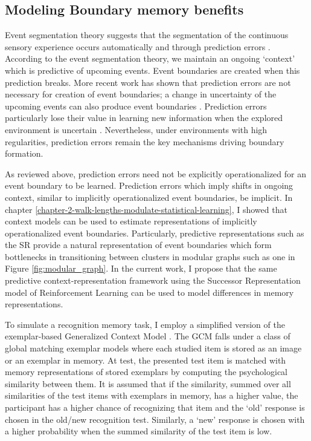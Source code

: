 \subsection*{Modeling Boundary memory benefits}
Event segmentation theory suggests that the segmentation of the continuous sensory experience occurs automatically and through prediction errors \parencite{zacks2007event,zacks2007eventp, swallow2009event}. According to the event segmentation theory, we maintain an ongoing `context' which is predictive of upcoming events. Event boundaries are created when this prediction breaks. More recent work has shown that prediction errors are not necessary for creation of event boundaries; a change in uncertainty of the upcoming events can also produce event boundaries \parencite{shin2021structuring}. Prediction errors particularly lose their value in learning new information when the explored environment is uncertain \parencite{behrens2007learning}. Nevertheless, under environments with high regularities, prediction errors remain the key mechanisms driving boundary formation. 

As reviewed above, prediction errors need not be explicitly operationalized for an event boundary to be learned. Prediction errors which imply shifts in ongoing context, similar to implicitly operationalized event boundaries,  be implicit. In chapter \ref{chapter-2-walk-lengths-modulate-statistical-learning}, I showed that context models can be used to estimate representations of implicitly operationalized event boundaries. Particularly, predictive representations such as the SR provide a natural representation of event boundaries which form bottlenecks in transitioning between clusters in modular graphs such as one in Figure \ref{fig:modular_graph}. In the current work, I propose that the same predictive context-representation framework using the Successor Representation model of Reinforcement Learning \parencite{dayan1993improving, momennejad2017successor, russek2017predictive, momennejad2020learning,gershman2012successor} can be used to model differences in memory representations. 

To simulate a recognition memory task, I employ a simplified version of the exemplar-based Generalized Context Model \parencite{nosofsky2011generalized,nosofsky1986attention, nosofsky2011short}. The GCM falls under a class of global matching exemplar models where each studied item is stored as an image or an exemplar in memory. At test, the presented test item is matched with memory representations of stored exemplars by computing the psychological similarity between them. It is assumed that if the similarity, summed over all similarities of the test items with exemplars in memory, \ac{has a higher value}, the participant \ac{has a higher chance of recognizing} that item and the `old' response is chosen in the old/new recognition test. Similarly, a `new' response is chosen with a higher probability when the summed similarity of the test item is low. 

